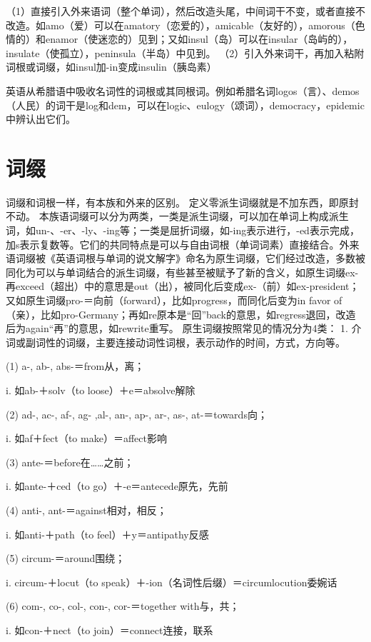 （1）直接引入外来语词（整个单词），然后改造头尾，中间词干不变，或者直接不改造。如amo（爱）可以在amatory（恋爱的），amicable（友好的），amorous（色情的）和enamor（使迷恋的）见到；又如insul（岛）可以在insular（岛屿的），insulate（使孤立），peninsula（半岛）中见到。
（2）引入外来词干，再加入粘附词根或词缀，如insul加-in变成insulin（胰岛素）

英语从希腊语中吸收名词性的词根或其同根词。例如希腊名词logos（言）、demos（人民）的词干是log和dem，可以在logic、eulogy（颂词），democracy，epidemic中辨认出它们。

\section{词缀}
词缀和词根一样，有本族和外来的区别。 定义零派生词缀就是不加东西，即原封不动。
本族语词缀可以分为两类，一类是派生词缀，可以加在单词上构成派生词，如un-、-er、-ly、-ing等；一类是屈折词缀，如-ing表示进行，-ed表示完成，加s表示复数等。它们的共同特点是可以与自由词根（单词词素）直接结合。外来语词缀被《英语词根与单词的说文解字》命名为原生词缀，它们经过改造，多数被同化为可以与单词结合的派生词缀，有些甚至被赋予了新的含义，如原生词缀ex-再exceed（超出）中的意思是out（出），被同化后变成ex-（前）如ex-president；又如原生词缀pro-＝向前（forward），比如progress，而同化后变为in favor of（亲），比如pro-Germany；再如re原本是“回”back的意思，如regress退回，改造后为again“再”的意思，如rewrite重写。
原生词缀按照常见的情况分为4类：
1.	介词或副词性的词缀，主要连接动词性词根，表示动作的时间，方式，方向等。

(1)	a-, ab-, abs-＝from从，离；

i.	如ab-＋solv（to loose）＋e＝absolve解除

(2)	ad-, ac-, af-, ag- ,al-, an-, ap-, ar-, as-, at-＝towards向；

i.	如af＋fect（to make）＝affect影响

(3)	ante-＝before在……之前；

i.	如ante-＋ced（to go）＋-e＝antecede原先，先前

(4)	anti-, ant-＝against相对，相反；

i.	如anti-＋path（to feel）＋y＝antipathy反感

(5) circum-＝around围绕；

i.	circum-＋locut（to speak）＋-ion（名词性后缀）＝circumlocution委婉话

(6)	com-, co-, col-, con-, cor-＝together with与，共；

i.	如con-＋nect（to join）＝connect连接，联系

